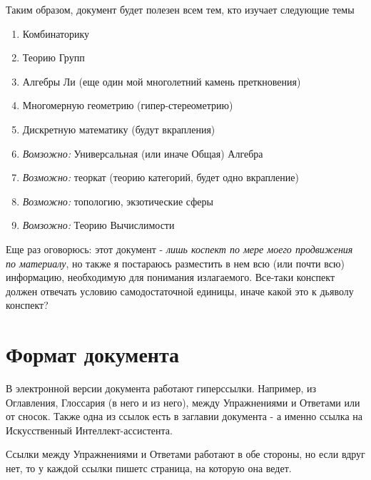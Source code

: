\documentclass{book}
\begin{document}
{Таким образом, документ будет полезен всем тем, кто изучает следующие темы
\begin{enumerate}
\item Комбинаторику
\item Теорию Групп
\item Алгебры Ли (еще один мой многолетний камень преткновения)
\item Многомерную геометрию (гипер-стереометрию)
\item Дискретную математику (будут вкрапления)
\item \textit{Вомзожно:} Универсальная (или иначе Общая) Алгебра
\item \textit{Возможно:} теоркат (теорию категорий, будет одно вкрапление)
\item \textit{Возможно:} топологию, экзотические сферы
\item \textit{Вомзожно:} Теорию Вычислимости
\end{enumerate}

Еще раз оговорюсь: этот документ - \textit{лишь коспект по мере моего продвижения по материалу}, но также я постараюсь разместить в нем всю (или почти всю) информацию, необходимую для понимания излагаемого. Все-таки конспект должен отвечать условию самодостаточной единицы, иначе какой это к дьяволу конспект?

}

{

\clearpage
{} %
\section*{Формат документа}

В электронной версии документа работают гиперссылки. Например, из Оглавления, Глоссария (в него и из него), между Упражнениями и Ответами или от сносок. Также одна из ссылок есть в заглавии документа - а именно ссылка на Искусственный Интеллект-ассистента.

Ссылки между Упражнениями и Ответами работают в обе стороны, но если вдруг нет, то у каждой ссылки пишетс страница, на которую она ведет.

}
\end{document}
